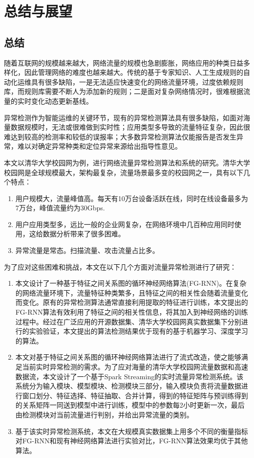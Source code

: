 \chapter{总结与展望}
\section{总结}
随着互联网的规模越来越大，网络流量的规模也急剧膨胀，网络应用的种类日益多样化，因此管理网络的难度也越来越大。传统的基于专家知识、人工生成规则的自动化运维具有很多缺陷，一是无法适应快速变化的网络流量环境，过度依赖规则库，而规则库需要不断人为添加新的规则；二是面对复杂网络情况时，很难根据流量的实时变化动态更新基线。

异常检测作为智能运维的关键环节，现有的异常检测算法具有很多缺陷，如面对海量数据规模时，无法或很难做到实时性；应用类型多导致的流量特征复杂，因此很难达到较高的检测率和较低的误报率；大多数异常检测算法仅能报告是否发生异常，难以对确定异常种类和定位异常来源给出指导性意见。

本文以清华大学校园网为例，进行网络流量异常检测算法和系统的研究。清华大学校园网是全球规模最大，架构最复杂，流量场景最多变的校园网之一，具有以下几个特点：
\begin{enumerate}
    \item 用户规模大，流量峰值高。每天有10万台设备活跃在线，同时在线设备最多为7万台，峰值流量约为30Gbps.
    \item	用户应用类型多，远比一般的企业网复杂，在网络环境中几百种应用同时使用，这给数据分析带来了很多困难。
    \item	异常流量是常态。扫描流量、攻击流量占比多。
\end{enumerate}

为了应对这些困难和挑战，本文在以下几个方面对流量异常检测进行了研究：
\begin{enumerate}
    \item 本文设计了一种基于特征之间关系图的循环神经网络算法(FG-RNN)。在复杂的网络流量环境下，流量特征种类繁多，且特征之间的相关性会随着流量变化而变化。原有的异常检测算法通常直接利用提取的特征进行训练，本文提出的FG-RNN算法有效利用了特征之间的相关性信息，将其加入到神经网络的训练过程中。经过在广泛应用的开源数据集、清华大学校园网真实数据集下分别进行的实验验证，本文提出的算法检测结果优于现有的基于机器学习、深度学习的算法。
    \item 本文对基于特征之间关系图的循环神经网络算法进行了流式改造，使之能够满足当前实时异常检测的需求。为了应对海量的清华大学校园网流量数据和高速数据流，本文设计了一个基于Spark Streaming的实时流量异常检测系统。该系统分为输入模块、模型模块、检测模块三部分，输入模块负责将流量数据进行窗口划分、特征选择、特征抽取、合并计算，得到的特征矩阵与预训练得到的关系矩阵一同送到模型中进行训练，模型中的参数每2小时更新一次，最后由检测模块对当前流量进行判别，并给出异常流量的类别。
    \item 基于该实时异常检测系统，本文在大规模真实数据集上用多个不同的衡量指标对FG-RNN和现有神经网络算法进行实验对比，FG-RNN算法效果均优于其他算法。
\end{enumerate}

